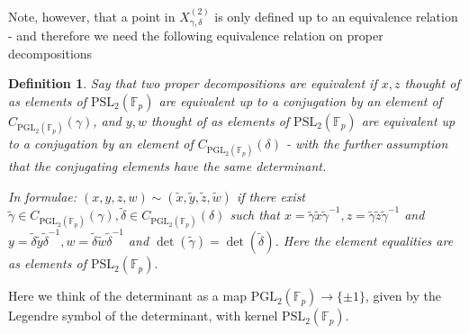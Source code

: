 \documentclass[letterpaper]{amsart}
\newtheorem{definition}[theorem]{Definition}
\begin{document}
Note, however, that a point in $X^{(2)}_{\gamma,\delta}$ is only defined up to an equivalence relation - and therefore we need the following equivalence relation on proper decompositions
\begin{definition}
    Say that two proper decompositions are equivalent if $x,z$ thought of as elements of $\mathrm{PSL}_2(\mathbb{F}_p)$ are equivalent up to a conjugation by an element of $C_{\mathrm{PGL}_2(\mathbb{F}_p)}(\gamma)$, and $y,w$ thought of as elements of $\mathrm{PSL}_2(\mathbb{F}_p)$ are equivalent up to a conjugation by an element of $C_{\mathrm{PGL}_2(\mathbb{F}_p)}(\delta)$ - with the further assumption that the conjugating elements have the same determinant.

    In formulae:
    $(x,y,z,w)\sim(\tilde{x},\tilde{y},\tilde{z},\tilde{w})$ if there exist $\tilde{\gamma}\in C_{\mathrm{PGL}_2(\mathbb{F}_p)}(\gamma),\tilde{\delta}\in C_{\mathrm{PGL}_2(\mathbb{F}_p)}(\delta)$ such that $x=\tilde{\gamma}\tilde{x}\tilde{\gamma}^{-1},z=\tilde{\gamma}\tilde{z}\tilde{\gamma}^{-1}$ and $y=\tilde{\delta}\tilde{y}\tilde{\delta}^{-1}, w=\tilde{\delta}\tilde{w}\tilde{\delta}^{-1}$ and $\det(\tilde{\gamma}) = \det(\tilde{\delta})$. Here the element equalities are as elements of $\mathrm{PSL}_2(\mathbb{F}_p).$
\end{definition}
Here we think of the determinant as a map $\mathrm{PGL}_2(\mathbb{F}_p) \to \{\pm 1\}$, given by the Legendre symbol of the determinant, with kernel $\mathrm{PSL}_2(\mathbb{F}_p).$
\end{document}
